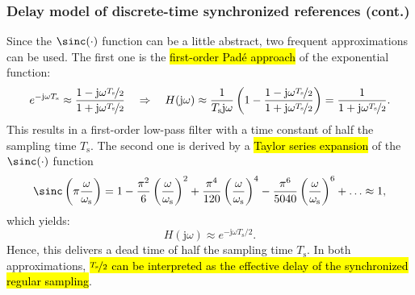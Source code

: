 \begin{frame}
    \frametitle{Delay model of discrete-time synchronized references (cont.)}
    Since the $\sinc(\cdot)$ function can be a little abstract, two frequent approximations can be used. \pause  The first one is the \hl{first-order Pad\'e approach} of the exponential function:
    \begin{equation}
        e^{-\mathrm{j}\omega T_\mathrm{s}} \approx \frac{1 - \mathrm{j}\omega \nicefrac{T_\mathrm{s}}{2}}{1 + \mathrm{j}\omega \nicefrac{T_\mathrm{s}}{2}} \quad \Rightarrow \quad H(\mathrm{j}\omega) \approx \frac{1}{T_\mathrm{s}\mathrm{j}\omega}\left(1-\frac{1 - \mathrm{j}\omega \nicefrac{T_\mathrm{s}}{2}}{1 + \mathrm{j}\omega \nicefrac{T_\mathrm{s}}{2}}\right)=\frac{1}{1+\mathrm{j}\omega \nicefrac{T_\mathrm{s}}{2}}.
    \end{equation}\pause
    This results in a first-order low-pass filter with a time constant of half the sampling time $T_\mathrm{s}$. \pause The second one is derived by a \hl{Taylor series expansion} of the $\sinc(\cdot)$ function
    \begin{equation}
        \sinc\left(\pi\frac{\omega}{\omega_\mathrm{s}}\right) = 1 - \frac{\pi^2}{6}\left(\frac{\omega}{\omega_\mathrm{s}}\right)^2 + \frac{\pi^4}{120}\left(\frac{\omega}{\omega_\mathrm{s}}\right)^4 - \frac{\pi^6}{5040}\left(\frac{\omega}{\omega_\mathrm{s}}\right)^6 + \ldots \approx 1,
    \end{equation}
    which yields:
    \begin{equation}
        H(\mathrm{j}\omega) \approx e^{-\mathrm{j}\omega T_\mathrm{s}/2}.
    \end{equation}\pause
    Hence, this delivers a dead time of half the sampling time $T_\mathrm{s}$. \pause In both approximations, \hl{$\nicefrac{T_\mathrm{s}}{2}$ can be interpreted as the effective delay of the synchronized regular sampling}.
\end{frame}

